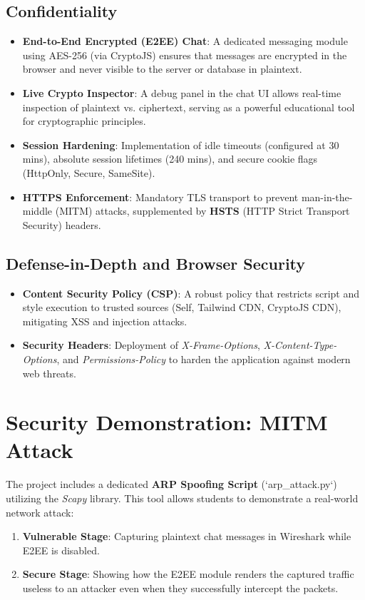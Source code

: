 \documentclass[12pt,a4paper]{article}
\begin{document}
\subsection{Confidentiality}
\begin{itemize}[noitemsep]
    \item \textbf{End-to-End Encrypted (E2EE) Chat}: A dedicated messaging module using AES-256 (via CryptoJS) ensures that messages are encrypted in the browser and never visible to the server or database in plaintext.
    \item \textbf{Live Crypto Inspector}: A debug panel in the chat UI allows real-time inspection of plaintext vs. ciphertext, serving as a powerful educational tool for cryptographic principles.
    \item \textbf{Session Hardening}: Implementation of idle timeouts (configured at 30 mins), absolute session lifetimes (240 mins), and secure cookie flags (HttpOnly, Secure, SameSite).
    \item \textbf{HTTPS Enforcement}: Mandatory TLS transport to prevent man-in-the-middle (MITM) attacks, supplemented by \textbf{HSTS} (HTTP Strict Transport Security) headers.
\end{itemize}

\subsection{Defense-in-Depth and Browser Security}
\begin{itemize}[noitemsep]
    \item \textbf{Content Security Policy (CSP)}: A robust policy that restricts script and style execution to trusted sources (Self, Tailwind CDN, CryptoJS CDN), mitigating XSS and injection attacks.
    \item \textbf{Security Headers}: Deployment of \textit{X-Frame-Options}, \textit{X-Content-Type-Options}, and \textit{Permissions-Policy} to harden the application against modern web threats.
\end{itemize}

\section{Security Demonstration: MITM Attack}
The project includes a dedicated \textbf{ARP Spoofing Script} (`arp_attack.py`) utilizing the \textit{Scapy} library. This tool allows students to demonstrate a real-world network attack:
\begin{enumerate}
    \item \textbf{Vulnerable Stage}: Capturing plaintext chat messages in Wireshark while E2EE is disabled.
    \item \textbf{Secure Stage}: Showing how the E2EE module renders the captured traffic useless to an attacker even when they successfully intercept the packets.
\end{enumerate}
\end{document}

